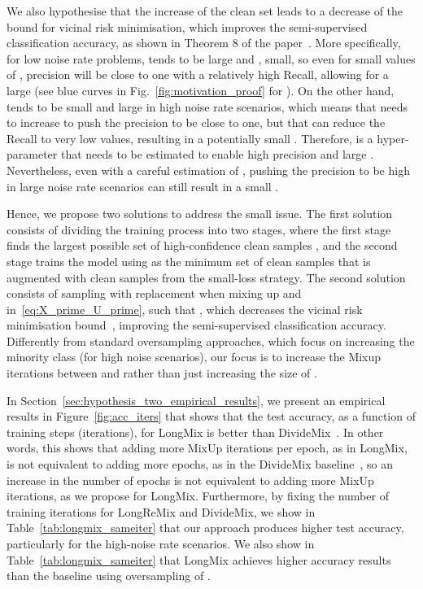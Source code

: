 \documentclass[review]{elsarticle}
\begin{document}
We also hypothesise that the increase of the clean set  leads to a decrease of the bound for vicinal risk minimisation, which improves the semi-supervised classification accuracy, as shown in Theorem 8 of the paper~\cite{zhang2018generalization}.
More specifically, for low noise rate problems,  tends to be large and , small, so even for small values of , precision will be close to one with a relatively high Recall, allowing for a large  (see blue curves in Fig.~\ref{fig:motivation_proof} for ).
On the other hand,  tends to be small and  large in high noise rate scenarios, which means that  needs to increase to push the precision to be close to one, but that can reduce the Recall to very low values, resulting in a potentially small .  
Therefore,  is a hyper-parameter that needs to be estimated to enable high precision and large .
Nevertheless, even with a careful estimation of , pushing the precision to be high in large noise rate scenarios can still result in a small .



Hence, we propose two solutions to address the small  issue. The first solution consists of dividing the training process into two stages, where the first stage finds the largest possible set of high-confidence clean samples , and the second stage trains the model using  as the minimum set of clean samples that is augmented with clean samples from the small-loss strategy. The second solution consists of sampling 
 with replacement when mixing up  and  in~\eqref{eq:X_prime_U_prime}, such that , which decreases the vicinal risk minimisation bound~\cite{zhang2018generalization}, improving the semi-supervised classification accuracy. Differently from standard oversampling approaches, which focus on increasing the minority class  (for high noise scenarios), our focus is to increase the Mixup iterations between  and  rather than just increasing the size of .
 

 
 In Section~\ref{sec:hypothesis_two_empirical_results}, we present an empirical results in Figure~\ref{fig:acc_iters} that shows that the test accuracy, as a function of training steps (iterations), for LongMix is better than DivideMix~\cite{li2020dividemix}. In other words, this shows that adding more MixUp iterations per epoch, as in LongMix, is not equivalent to adding more epochs, as in the DivideMix baseline~\cite{li2020dividemix}, so an  increase in the number of epochs is not equivalent to adding more MixUp iterations, as we propose for LongMix. 
 Furthermore, by fixing the number of training iterations for LongReMix and DivideMix, we show in Table~\ref{tab:longmix_sameiter} that our approach produces higher test accuracy, particularly for the high-noise rate scenarios. We also show in Table~\ref{tab:longmix_sameiter} that LongMix achieves higher accuracy results than the baseline using oversampling of .
\end{document}

